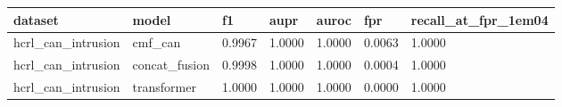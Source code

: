\begin{tabular}{lllllll}
\toprule
dataset & model & f1 & aupr & auroc & fpr & recall\_at\_fpr\_1em04 \\
\midrule
hcrl\_can\_intrusion & cmf\_can & 0.9967 & 1.0000 & 1.0000 & 0.0063 & 1.0000 \\
hcrl\_can\_intrusion & concat\_fusion & 0.9998 & 1.0000 & 1.0000 & 0.0004 & 1.0000 \\
hcrl\_can\_intrusion & transformer & 1.0000 & 1.0000 & 1.0000 & 0.0000 & 1.0000 \\
\bottomrule
\end{tabular}
